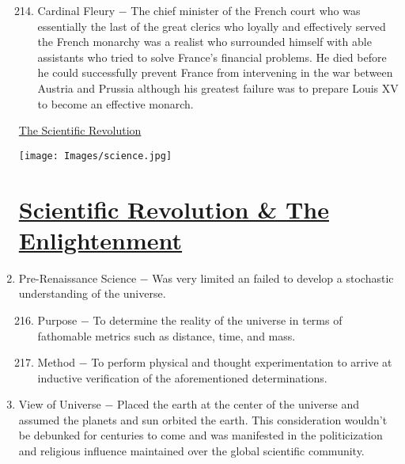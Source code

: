 \documentclass[12pt]{article}
\begin{document}
\begin{enumerate}
\begin{enumerate}[label=\arabic{*}.]
\setcounter{enumii}{213}
 
\item Cardinal Fleury $-$ The chief minister of the French court who was essentially the last of the great clerics who loyally and effectively served the French monarchy was a realist who surrounded himself with able assistants who tried to solve France's financial problems. He died before he could successfully prevent France from intervening in the war between Austria and Prussia although his greatest failure was to prepare Louis XV to become an effective monarch.

\end{enumerate}
\setcounter{enumi}{214}

\newpage
\begin{center}
\end{center}
\begin{center}
\end{center}
\begin{center}
\underline{\Huge The Scientific Revolution}
\end{center}
\vspace{50pt}
\texttt{[image: Images/science.jpg]}
\newpage

\section{\underline{Scientific Revolution \& The Enlightenment}}

\item Pre-Renaissance Science $-$ Was very limited an failed to develop a stochastic understanding of the universe. 

\begin{enumerate}[label=\arabic{*}.]
\setcounter{enumii}{215}

\item Purpose $-$ To determine the reality of the universe in terms of fathomable metrics such as distance, time, and mass.

\item Method $-$ To perform physical and thought experimentation to arrive at inductive verification of the aforementioned determinations.

\end{enumerate}
\setcounter{enumi}{217}

\item View of Universe $-$ Placed the earth at the center of the universe and assumed the planets and sun orbited the earth. This consideration wouldn't be debunked for centuries to come and was manifested in the politicization and religious influence maintained over the global scientific community.


\end{enumerate}
\end{document}
